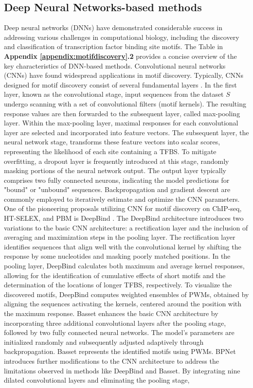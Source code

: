 \documentclass[a4paper, titlepage, openright]{book}
\begin{document}
\subsection{Deep Neural Networks-based methods}\label{subsection:dnn-methods-appendix}
Deep neural networks (DNNs) have demonstrated considerable success in addressing various challenges in computational biology, including the discovery and classification of transcription factor binding site motifs. The Table in \textbf{Appendix \ref{appendix:motifdiscovery}.2} provides a concise overview of the key characteristics of DNN-based methods. Convolutional neural networks (CNNs) \citep{lecun2015deep} have found widespread applications in motif discovery. Typically, CNNs designed for motif discovery consist of several fundamental layers \citep{zeng2016convolutional}. In the first layer, known as the convolutional stage, input sequences from the dataset $S$ undergo scanning with a set of convolutional filters (motif kernels). The resulting response values are then forwarded to the subsequent layer, called max-pooling layer. Within the max-pooling layer, maximal responses for each convolutional layer are selected and incorporated into feature vectors. The subsequent layer, the neural network stage, transforms these feature vectors into scalar scores, representing the likelihood of each site containing a TFBS. To mitigate overfitting, a dropout layer is frequently introduced at this stage, randomly masking portions of the neural network output. The output layer typically comprises two fully connected neurons, indicating the model predictions for "bound" or "unbound" sequences. Backpropagation and gradient descent are commonly employed to iteratively estimate and optimize the CNN parameters. One of the pioneering proposals utilizing CNN for motif discovery on ChIP-seq, HT-SELEX, and PBM is DeepBind \citep{alipanahi2015predicting}. The DeepBind architecture introduces two variations to the basic CNN architecture: a rectification layer and the inclusion of averaging and maximization steps in the pooling layer. The rectification layer identifies sequences that align well with the convolutional kernel by shifting the response by some nucleotides and masking poorly matched positions. In the pooling layer, DeepBind calculates both maximum and average kernel responses, allowing for the identification of cumulative effects of short motifs and the determination of the locations of longer TFBS, respectively. To visualize the discovered motifs, DeepBind computes weighted ensembles of PWMs, obtained by aligning the sequences activating the kernels, centered around the position with the maximum response. Basset \citep{kelley2016basset} enhances the basic CNN architecture by incorporating three additional convolutional layers after the pooling stage, followed by two fully connected neural networks. The model's parameters are initialized randomly and subsequently adjusted adaptively through backpropagation. Basset represents the identified motifs using PWMs. BPNet \citep{avsec2021base} introduces further modifications to the CNN architecture to address the limitations observed in methods like DeepBind and Basset. By integrating nine dilated convolutional layers and eliminating the pooling stage, 
\end{document}
